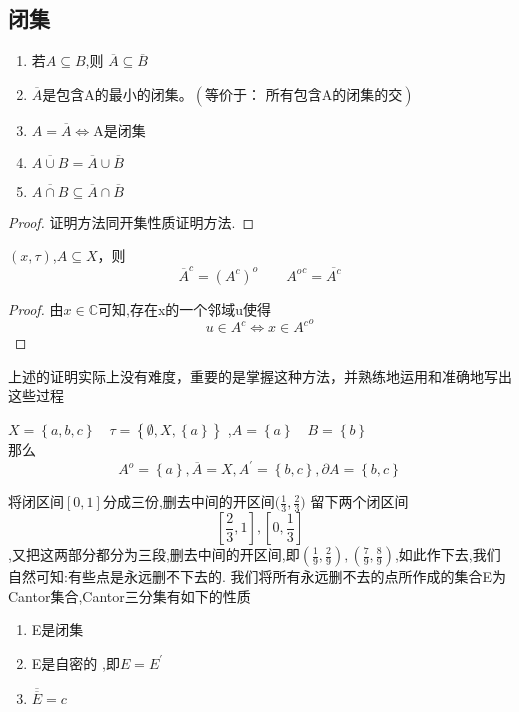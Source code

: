 \subsection{闭集}
\begin{Corollary}
    \begin{enumerate}
        \item 若\(A \subseteq B\),则 \(\overline{A} \subseteq \overline{B}\) \\
        \item \(\overline{A}\)是包含A的最小的闭集。\(\left(\text{等价于： 所有包含A的闭集的交}\right)\) \\
        \item \(A = \overline{A} \Longleftrightarrow \text{A是闭集} \) \\
        \item \(\overline{A \cup B} = \overline{A} \cup \overline{B}\) \\
        \item \(\overline{A \cap B} \subseteq \overline{A} \cap \overline{B}\)
    \end{enumerate}
\end{Corollary}
\begin{proof}
    证明方法同开集性质证明方法.
\end{proof}
\begin{Corollary}
    \(\left(x,\tau\right)\),\(A \subseteq X\)，则\[{\overline{A}}^{c}={\left(A^c\right)^{o}} \qquad {A^o}^c=\overline{A^c}\]
\end{Corollary}
\begin{proof}
    由\(x \in \mathbb{C}\)可知,存在x的一个邻域u使得 \[u \in A^c \Longleftrightarrow x \in {A^c}^o\]
\end{proof}
\begin{note}
    上述的证明实际上没有难度，重要的是掌握这种方法，并熟练地运用和准确地写出这些过程
\end{note}
\begin{example}
    \(X=\left\{a,b,c\right\} \quad \tau=\left\{\emptyset,X,\left\{a\right\}\right\}\)
    ,\(A = \left\{a\right\} \quad B=\left\{b\right\}\)
\\
    那么 \[A^o=\left\{a\right\},\overline{A}=X,A^{'}=\left\{b,c\right\},\partial A =\left\{b,c\right\}\]
\end{example}
\begin{example}[Cantor三分集]
    将闭区间\([0,1]\)分成三份,删去中间的开区间\(\bigl(\frac{1}{3}, \frac{2}{3}\bigr)\) 留下两个闭区间\[[\frac{2}{3},1],[0,\frac{1}{3}]\],又把这两部分都分为三段,删去中间的开区间,即\((\frac{1}{9},\frac{2}{9}),(\frac{7}{9},\frac{8}{9})\),如此作下去,我们自然可知:有些点是永远删不下去的.
    我们将所有永远删不去的点所作成的集合E为Cantor集合,Cantor三分集有如下的性质
    \begin{enumerate}
        \item E是闭集 \\ 
        \item E是自密的 ,即\(E = E^{'}\) \\ 
        \item \(\overline{\overline{E}} =c\) 
    \end{enumerate}
\end{example}
